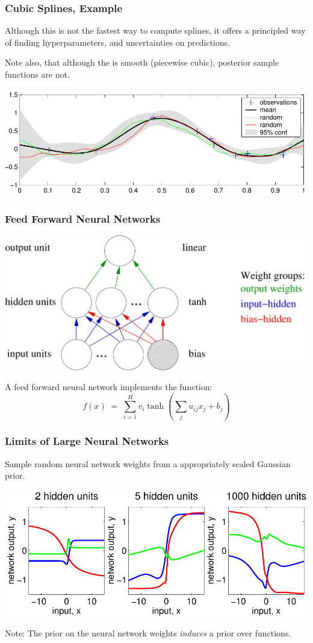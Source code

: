 \begin{frame}
\frametitle{Cubic Splines, Example}

Although this is not the fastest way to compute splines, it offers
a principled way of finding hyperparameters, and uncertainties on predictions.

Note also, that although the  is smooth
(piecewise cubic), posterior sample functions are not.

\includegraphics[width=\textwidth]{gpsplines}
\end{frame}


\begin{frame}
\frametitle{Feed Forward Neural Networks}
\includegraphics[width=\textwidth]{network}

A feed forward neural network implements the function:
\[
f(x)\;=\;\sum_{i=1}^H v_i\tanh(\sum_j u_{ij}x_j+b_j)
\]
\end{frame}

\begin{frame}
\frametitle{Limits of Large Neural Networks}
Sample random neural network weights from a appropriately scaled Gaussian prior.

\includegraphics[width=\textwidth]{networkprior}

Note: The prior on the neural network weights \emph{induces} a prior over
functions.
\end{frame}


